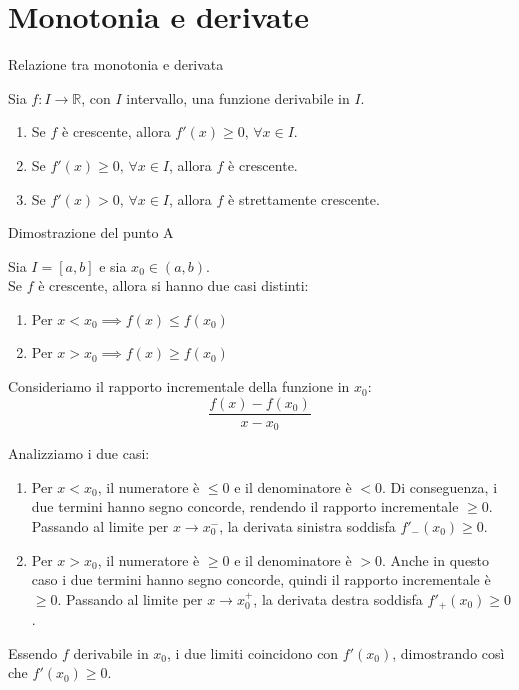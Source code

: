 \documentclass[12pt]{report}
\newcommand{\R}{\mathbb{R}}
\begin{document}
	\section{Monotonia e derivate}
	
	\begin{teorema}{Relazione tra monotonia e derivata}{}
		
		Sia $f: I \to \R$, con $I$ intervallo, una funzione derivabile in $I$.
		\begin{enumerate}
			
			\item[\textbf{A)}] Se $f$ è crescente, allora $f'(x) \geq 0, \, \forall x \in I$.
			
			\item[\textbf{B)}] Se $f'(x) \geq 0, \, \forall x \in I$, allora $f$ è crescente.
			
			\item[\textbf{C)}] Se $f'(x) > 0, \, \forall x \in I$, allora $f$ è strettamente crescente.
			
		\end{enumerate}
		
	\end{teorema}
	
	\begin{dimostrazione}{Dimostrazione del punto A}{}
		
		Sia $I = [a, b]$ e sia $x_0 \in (a, b)$.\\
		Se $f$ è crescente, allora si hanno due casi distinti:
		\begin{enumerate}
			
			\item Per $x < x_0 \implies f(x) \leq f(x_0)$
			
			\item Per $x > x_0 \implies f(x) \geq f(x_0)$
			
		\end{enumerate}
		
		Consideriamo il rapporto incrementale della funzione in $x_0$:
		\[
		\frac{f(x) - f(x_0)}{x - x_0}
		\]
		
		Analizziamo i due casi:
		\begin{enumerate}
			
			\item Per $x < x_0$, il numeratore è $\leq 0$ e il denominatore è $< 0$. Di conseguenza, i due termini hanno segno concorde, rendendo il rapporto incrementale $\geq 0$. Passando al limite per $x \to x_0^-$, la derivata sinistra soddisfa $f'_-(x_0) \geq 0$.
			
			\item Per $x > x_0$, il numeratore è $\geq 0$ e il denominatore è $> 0$. Anche in questo caso i due termini hanno segno concorde, quindi il rapporto incrementale è $\geq 0$. Passando al limite per $x \to x_0^+$, la derivata destra soddisfa $f'_+(x_0) \geq 0$.
			
		\end{enumerate}
		Essendo $f$ derivabile in $x_0$, i due limiti coincidono con $f'(x_0)$, dimostrando così che $f'(x_0) \geq 0$.
		
	\end{dimostrazione}
	
\end{document}

